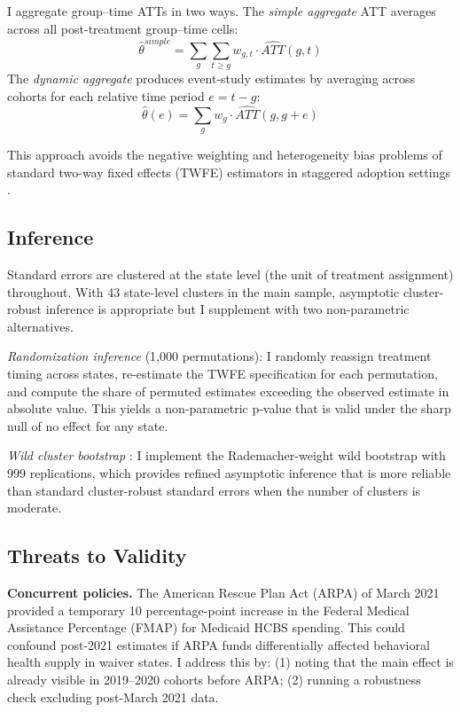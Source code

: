 \documentclass[12pt]{article}
\begin{document}
I aggregate group--time ATTs in two ways. The \textit{simple aggregate} ATT averages across all post-treatment group--time cells:
\begin{equation}
    \hat{\theta}^{simple} = \sum_{g} \sum_{t \geq g} w_{g,t} \cdot \widehat{ATT}(g,t)
\end{equation}
The \textit{dynamic aggregate} produces event-study estimates by averaging across cohorts for each relative time period $e = t - g$:
\begin{equation}
    \hat{\theta}(e) = \sum_{g} w_g \cdot \widehat{ATT}(g, g + e)
\end{equation}

This approach avoids the negative weighting and heterogeneity bias problems of standard two-way fixed effects (TWFE) estimators in staggered adoption settings \citep{goodman2021difference, de2020two, borusyak2024revisiting}.

\subsection{Inference}

Standard errors are clustered at the state level (the unit of treatment assignment) throughout. With 43 state-level clusters in the main sample, asymptotic cluster-robust inference is appropriate but I supplement with two non-parametric alternatives.

\textit{Randomization inference} (1,000 permutations): I randomly reassign treatment timing across states, re-estimate the TWFE specification for each permutation, and compute the share of permuted estimates exceeding the observed estimate in absolute value. This yields a non-parametric p-value that is valid under the sharp null of no effect for any state.

\textit{Wild cluster bootstrap} \citep{roodman2019fast}: I implement the Rademacher-weight wild bootstrap with 999 replications, which provides refined asymptotic inference that is more reliable than standard cluster-robust standard errors when the number of clusters is moderate.

\subsection{Threats to Validity}

\textbf{Concurrent policies.} The American Rescue Plan Act (ARPA) of March 2021 provided a temporary 10 percentage-point increase in the Federal Medical Assistance Percentage (FMAP) for Medicaid HCBS spending. This could confound post-2021 estimates if ARPA funds differentially affected behavioral health supply in waiver states. I address this by: (1) noting that the main effect is already visible in 2019--2020 cohorts before ARPA; (2) running a robustness check excluding post-March 2021 data.
\end{document}
